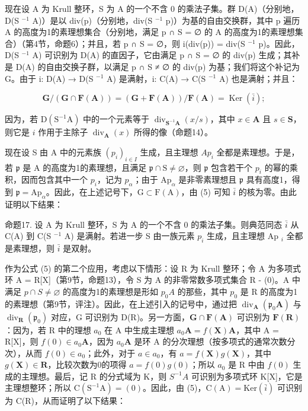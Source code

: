 现在设 A 为 Krull 整环，S 为 A 的一个不含 0 的乘法子集。群 D(A)（分别地，D(S \(^{-1}\) A)）是以 div(p)（分别地，div(S \(^{-1}\) p)）为基的自由交换群，其中 p 遍历 A 的高度为1的素理想集合（分别地，满足 p ∩ S = ∅ 的 A 的高度为1的素理想集合）（第4节，命题6）；并且，若 p ∩ S = ∅，则 i(div(p)) = div(S \(^{-1}\) p)。因此，D(S \(^{-1}\) A) 可识别为 D(A) 的直因子，它由满足 p ∩ S = ∅ 的 div(p) 生成；其补是 D(A) 的自由交换子群，以满足 p ∩ S ≠ ∅ 的 div(p) 为基；我们将这个补记为 G。由于 i: D(A) → D(S \(^{-1}\) A) 是满射，i: C(A) → C(S \(^{-1}\) A) 也是满射；并且：

\[
\mathbf {G} / (\mathbf {G} \cap \mathbf {F} (\mathbf {A})) = (\mathbf {G} + \mathbf {F} (\mathbf {A})) / \mathbf {F} (\mathbf {A}) = \operatorname{Ker} (\bar {i});\tag{5}
\]

因为，若 \(\mathrm{D}(\mathrm{S}^{-1}\mathrm{A})\) 中的一个元素等于 \(\operatorname{div}_{\mathbf{S}^{-1}\mathbf{A}}(x / s)\)，其中 \(x \in \mathbf{A}\) 且 \(s \in \mathbf{S}\)，则它是 \(i\) 作用于主除子 \(\operatorname{div}_{\mathbf{A}}(x)\) 所得的像（命题14）。

现在设 S 由 A 中的元素族 \((p_{i})_{i\in I}\) 生成，且主理想 \(Ap_{i}\) 全都是素理想。于是，若 \(\mathfrak{p}\) 是 A 的高度为1的素理想，且满足 \(\mathfrak{p} \cap \mathrm{S} \neq \varnothing\)，则 \(\mathfrak{p}\) 包含若干个 \(p_{i}\) 的幂的乘积，因而包含其中一个 \(p_{i}\)，记为 \(p_{\alpha}\)；由于 \(\mathrm{Ap}_{\alpha}\) 是非零素理想且 \(\mathfrak{p}\) 具有高度1，得到 \(\mathfrak{p} = \mathrm{Ap}_{\alpha}\)。因此，在上述记号下，\(\mathrm{G} \subset \mathrm{F}(\mathrm{A})\)，由 (5) 可知 \(\bar{i}\) 的核为零。由此证明以下结果：

命题17. 设 A 为 Krull 整环，S 为 A 的一个不含 0 的乘法子集。则典范同态 \(\bar{i}\) 从 C(A) 到 C(S \(^{-1}\) A) 是满射。若进一步 S 由一族元素 \(p_{i}\) 生成，且主理想 Ap \(_{i}\) 全都是素理想，则 \(\bar{i}\) 是双射。

作为公式 (5) 的第二个应用，考虑以下情形：设 R 为 Krull 整环；令 A 为多项式环 A = R{[}X{]}（第9节，命题13），令 S 为 A 的非零常数多项式集合 R - (0)。A 中满足 \(p \cap S \neq \varnothing\) 的高度为1的素理想是形如 \(p_{0}A\) 的那些，其中 \(p_{0}\) 是 R 的高度为1的素理想（第9节，评注）。因此，在上述引入的记号中，通过把 \(\operatorname{div}_{\mathbf{A}}(\mathfrak{p}_{0}\mathbf{A})\) 与 \(\operatorname{div}_{\mathbf{R}}(\mathfrak{p}_{0})\) 对应，G 可识别为 D(R)。另一方面，\(\mathbf{G} \cap \mathbf{F}(\mathbf{A})\) 可识别为 \(\mathbf{F}(\mathbf{R})\)：因为，若 R 中的理想 \(a_{0}\) 在 A 中生成主理想 \(a_{0}\mathbf{A} = f(\mathbf{X})\mathbf{A}\)，其中 A = R{[}X{]}，则 \(f(0) \in a_{0}\mathbf{A}\)，因为 \(a_{0}\mathbf{A}\) 是环 A 的分次理想（按多项式的通常次数分次），从而 \(f(0) \in a_{0}\)；此外，对于 \(a \in a_{0}\)，有 \(a = f(\mathbf{X})g(\mathbf{X})\)，其中 \(g(\mathbf{X}) \in \mathbf{R}\)，比较次数为0的项得 \(a = f(0)g(0)\)；所以 \(a_{0}\) 是 R 中由 \(f(0)\) 生成的主理想。最后，记 R 的分式域为 K，则 \(S^{-1}A\) 可识别为多项式环 K{[}X{]}，它是主理想整环；所以 \(\mathrm{C}(\mathrm{S}^{-1}\mathrm{A}) = (0)\)。因此，由 (5)，\(\mathrm{C}(\mathrm{A}) = \mathrm{Ker}(\bar{i})\) 可识别为 C(R)，从而证明了以下结果：

